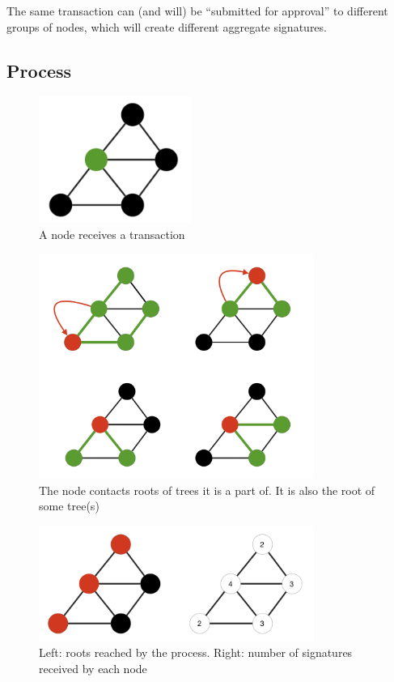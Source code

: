 \documentclass[11pt, a4paper, twoside, openright]{article}
\begin{document}
The same transaction can (and will) be ``submitted for approval'' to different groups of nodes, which will create different aggregate signatures. 

\subsection{Process}





\begin{figure}[htbp]
 \centering
  \includegraphics[width=5cm]{schema1.png}
  \caption{A node receives a transaction}
\end{figure}
  
\begin{figure}[htbp]
 \centering
  \includegraphics[width=9cm]{schema2.png}
  \caption{The node contacts roots of trees it is a part of. It is also the root of some tree(s)}
\end{figure}

\begin{figure}[htbp]
 \centering
  \includegraphics[width=9cm]{schema3.png}
  \caption{Left: roots reached by the process.
   Right: number of signatures received by each node}
\end{figure}
\end{document}
